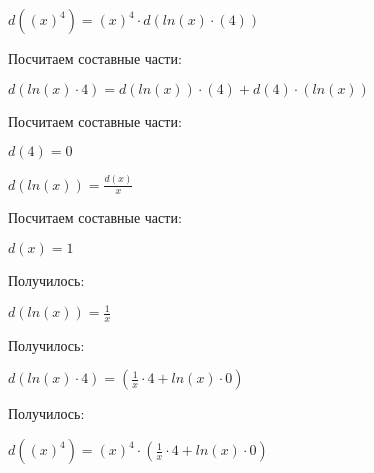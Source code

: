 $ d((x)^{4}) = (x)^{4} \cdot d(ln(x) \cdot (4))$

Посчитаем составные части:

$ d(ln(x) \cdot 4) = d(ln(x)) \cdot (4) + d(4) \cdot (ln(x))$

Посчитаем составные части:

$ d(4) = 0$

$ d(ln(x)) = \frac{d(x)}{x}$

Посчитаем составные части:

$ d(x) = 1$

Получилось:

$ d(ln(x)) = \frac{1}{x}$

Получилось:

$ d(ln(x) \cdot 4) = (\frac{1}{x} \cdot 4+ln(x) \cdot 0)$

Получилось:

$ d((x)^{4}) = (x)^{4} \cdot (\frac{1}{x} \cdot 4+ln(x) \cdot 0)$


